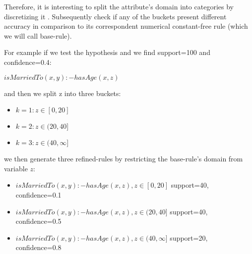 Therefore, it is interesting to split the attribute's domain into categories by discretizing it .
Subsequently check if any of the buckets present different accuracy in comparison to its correspondent numerical
constant-free rule (which we will call base-rule).

For example if we test the hypothesis and we find support=100 and confidence=0.4:

\begin{center}
 \begin{math}isMarriedTo(x,y) :- hasAge(x,z)\end{math} 
\end{center}

and then we split z into three buckets:

\begin{itemize}
 \item \begin{math} k=1: z\in[0,20]\end{math}
 \item \begin{math} k=2: z\in(20,40]\end{math}
 \item \begin{math} k=3: z\in(40,\infty]\end{math}
\end{itemize}

we then generate three refined-rules by restricting the base-rule's domain from variable $z$:

\begin{itemize}

 \item \begin{math}isMarriedTo(x,y) :- hasAge(x,z), z\in[0,20]\end{math}	
    \newline support=40, confidence=0.1
 \item \begin{math}isMarriedTo(x,y) :- hasAge(x,z), z\in(20,40]\end{math}	
    \newline support=40, confidence=0.5
 \item \begin{math}isMarriedTo(x,y) :- hasAge(x,z), z\in(40,\infty]\end{math}
    \newline support=20, confidence=0.8

\end{itemize}


